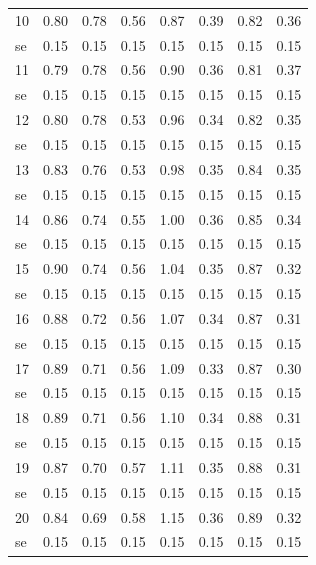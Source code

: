 \documentclass[11pt,preprint, authoryear]{elsarticle}
\numberwithin{equation}{section}
\numberwithin{figure}{section}
\numberwithin{table}{section}
\begin{document}
\begin{longtable}{lrrrrrrr}
  10 & 0.80 & 0.78 & 0.56 & 0.87 & 0.39 & 0.82 & 0.36 \\ 
  se & 0.15 & 0.15 & 0.15 & 0.15 & 0.15 & 0.15 & 0.15 \\ 
  11 & 0.79 & 0.78 & 0.56 & 0.90 & 0.36 & 0.81 & 0.37 \\ 
  se & 0.15 & 0.15 & 0.15 & 0.15 & 0.15 & 0.15 & 0.15 \\ 
  12 & 0.80 & 0.78 & 0.53 & 0.96 & 0.34 & 0.82 & 0.35 \\ 
  se & 0.15 & 0.15 & 0.15 & 0.15 & 0.15 & 0.15 & 0.15 \\ 
  13 & 0.83 & 0.76 & 0.53 & 0.98 & 0.35 & 0.84 & 0.35 \\ 
  se & 0.15 & 0.15 & 0.15 & 0.15 & 0.15 & 0.15 & 0.15 \\ 
  14 & 0.86 & 0.74 & 0.55 & 1.00 & 0.36 & 0.85 & 0.34 \\ 
  se & 0.15 & 0.15 & 0.15 & 0.15 & 0.15 & 0.15 & 0.15 \\ 
  15 & 0.90 & 0.74 & 0.56 & 1.04 & 0.35 & 0.87 & 0.32 \\ 
  se & 0.15 & 0.15 & 0.15 & 0.15 & 0.15 & 0.15 & 0.15 \\ 
  16 & 0.88 & 0.72 & 0.56 & 1.07 & 0.34 & 0.87 & 0.31 \\ 
  se & 0.15 & 0.15 & 0.15 & 0.15 & 0.15 & 0.15 & 0.15 \\ 
  17 & 0.89 & 0.71 & 0.56 & 1.09 & 0.33 & 0.87 & 0.30 \\ 
  se & 0.15 & 0.15 & 0.15 & 0.15 & 0.15 & 0.15 & 0.15 \\ 
  18 & 0.89 & 0.71 & 0.56 & 1.10 & 0.34 & 0.88 & 0.31 \\ 
  se & 0.15 & 0.15 & 0.15 & 0.15 & 0.15 & 0.15 & 0.15 \\ 
  19 & 0.87 & 0.70 & 0.57 & 1.11 & 0.35 & 0.88 & 0.31 \\ 
  se & 0.15 & 0.15 & 0.15 & 0.15 & 0.15 & 0.15 & 0.15 \\ 
  20 & 0.84 & 0.69 & 0.58 & 1.15 & 0.36 & 0.89 & 0.32 \\ 
  se & 0.15 & 0.15 & 0.15 & 0.15 & 0.15 & 0.15 & 0.15 \\ 
   \bottomrule
\end{longtable}
\endgroup
\end{document}
